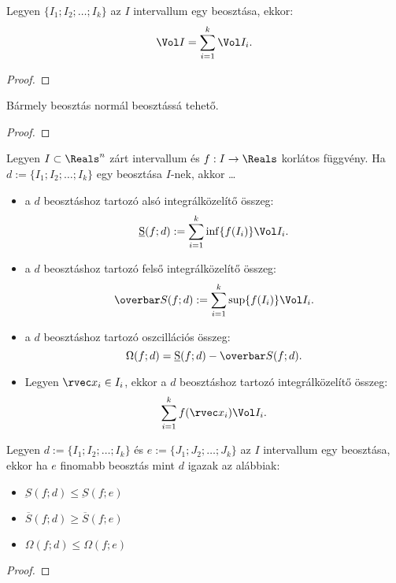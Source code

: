 \begin{statement}
  Legyen $\{ I_1; I_2; \ldots; I_k \}$ az $I$ intervallum egy beosztása, ekkor:
  $$
    \Vol I = \sum_{i = 1}^k \Vol I_i
    \text.
  $$
  \begin{proof}
    \vspace{5em}
  \end{proof}
\end{statement}

\begin{statement}
  Bármely beosztás normál beosztássá tehető.

  \begin{proof}
    \vspace{5em}
  \end{proof}
\end{statement}

\begin{definition}
  Legyen $I \subset \Reals^n$ zárt intervallum és $f: I \to \Reals$ korlátos
  függvény. Ha $d := \{ I_1; I_2; \ldots; I_k \}$ egy beosztása $I$-nek, akkor
  \dots
  \begin{itemize}
    \item a $d$ beosztáshoz tartozó alsó integrálközelítő összeg:
          $$
            \underbar S(f; d) := \sum_{i = 1}^k \inf \{ f(I_i) \} \Vol I_i
            \text.
          $$

    \item a $d$ beosztáshoz tartozó felső integrálközelítő összeg:
          $$
            \overbar S(f; d) := \sum_{i = 1}^k \sup \{ f(I_i) \} \Vol I_i
            \text.
          $$

    \item a $d$ beosztáshoz tartozó oszcillációs összeg:
          $$
            \Omega(f; d) = \underbar S(f; d) - \overbar S(f; d)
            \text.
          $$

    \item Legyen $\rvec x_i \in I_i$, ekkor a $d$ beosztáshoz tartozó
          integrálközelítő összeg:
          $$
            \sum_{i = 1}^k f(\rvec x_i) \Vol I_i
            \text.
          $$
  \end{itemize}
\end{definition}

\begin{statement}
  Legyen $d := \{ I_1; I_2; \ldots; I_k \}$ és
  $e := \{ J_1; J_2; \ldots; J_k \}$ az $I$ intervallum egy beosztása, ekkor
  ha $e$ finomabb beosztás mint $d$ igazak az alábbiak:
  \begin{itemize}
    \item $\underbar S(f; d) \leq \underbar S(f; e)$
    \item $\overbar S(f; d) \geq \overbar S(f; e)$
    \item $\Omega(f; d) \leq \Omega(f; e)$
  \end{itemize}

  \begin{proof}
    \vspace{8em}
  \end{proof}
\end{statement}

